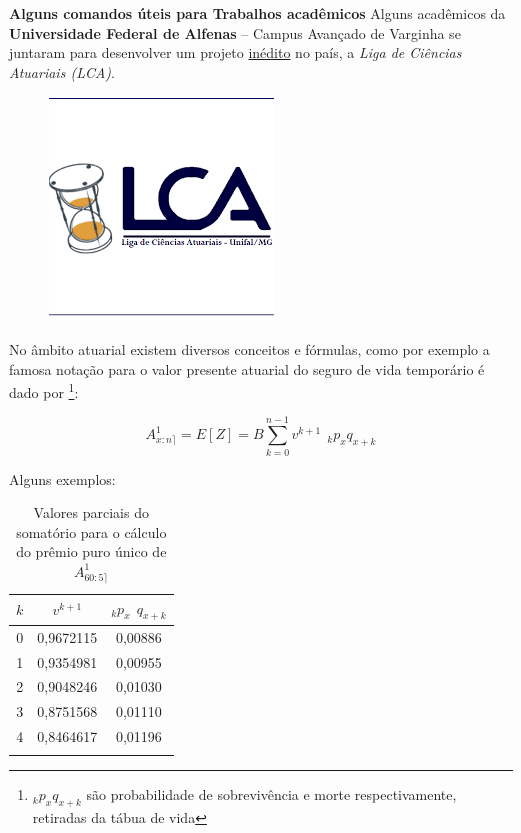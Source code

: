 \documentclass[12pt,openright]{report}
\begin{document}
\newpage
{\LARGE \textbf{Alguns comandos úteis para Trabalhos acadêmicos}}
\newpage
Alguns acadêmicos da \textbf{Universidade Federal de Alfenas} – Campus Avançado de Varginha se juntaram para desenvolver um projeto \underline{{\LARGE inédito}} no país, a \textit{Liga de Ciências Atuariais (LCA)}. 

\begin{figure}[H]
	\centering
	\includegraphics[width=0.3\linewidth]{LIGA}
	\label{fig:liga}
\end{figure}

No âmbito atuarial existem diversos conceitos e fórmulas, como por exemplo a famosa notação para o valor presente atuarial do seguro de vida temporário é dado por \footnote{$_{k}p_{x}q_{x+k}$ são probabilidade de sobrevivência e morte respectivamente, retiradas da tábua de vida}:

\begin{equation} A^{1}_{x:n \rceil} = E[Z]= B \sum_{k=0}^{n-1} v^{k+1} \ \ _{k}p_{x}q_{x+k}
\label{SegVidaTemp} 
\end{equation}

Alguns exemplos:

\begin{table}[H]
	\centering
	\caption{Valores parciais do somatório para o cálculo do prêmio puro único de $A^{1}_{60:5 \rceil}$}
	\label{my-label}
	\begin{tabular}{@{}ccc@{}}
		\hline
		$k$                     & $v^{k+1}$       & $_{k}p_{x} \ \ q_{x+k}$    \\ \hline
		0                     & 0,9672115 & 0,00886 \\
		1                     &0,9354981 & 0,00955 \\
		\multicolumn{1}{r}{2} & 0,9048246 & 0,01030 \\
		\multicolumn{1}{r}{3} & 0,8751568 & 0,01110 \\
		4                     & 0,8464617 & 0,01196 \\ \hline
		\label{pq}
	\end{tabular}
\end{table}
\end{document}
